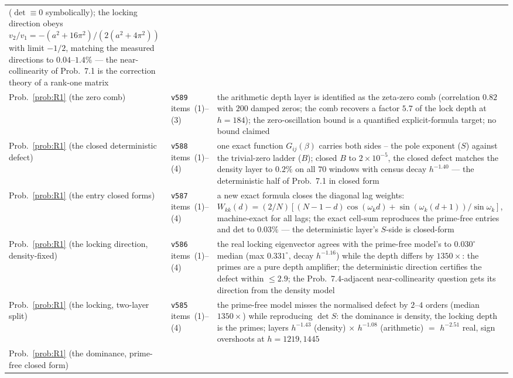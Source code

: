 \documentclass[11pt,a4paper]{article}
\theoremstyle{plain}
\theoremstyle{definition}
\begin{document}
{\begin{xltabular}{\textwidth}{@{}llY@{}}
    ($\det\equiv0$ symbolically); the locking direction obeys
    $v_2/v_1=-(a^2+16\pi^2)/(2(a^2+4\pi^2))$ with limit $-1/2$,
    matching the measured directions to $0.04$--$1.4\%$ --- the
    near-collinearity of Prob.~7.1 is the correction theory of a
    rank-one matrix \\
Prob.~\ref{prob:R1} (the zero comb)
  & \texttt{v589} items~(1)--(3)
  & the arithmetic depth layer is identified as the zeta-zero comb
    (correlation $0.82$ with $200$ damped zeros; the comb recovers a
    factor $5.7$ of the lock depth at $h=184$); the zero-oscillation
    bound is a quantified explicit-formula target; no bound claimed \\
Prob.~\ref{prob:R1} (the closed deterministic defect)
  & \texttt{v588} items~(1)--(4)
  & one exact function $G_{ij}(\beta)$ carries both sides -- the pole
    exponent ($S$) against the trivial-zero ladder ($B$); closed $B$
    to $2\times10^{-5}$, the closed defect matches the density layer
    to $0.2\%$ on all $70$ windows with census decay $h^{-1.40}$ ---
    the deterministic half of Prob.~7.1 in closed form \\
Prob.~\ref{prob:R1} (the entry closed forms)
  & \texttt{v587} items~(1)--(4)
  & a new exact formula closes the diagonal lag weights:
    $W_{kk}(d)=(2/N)[(N{-}1{-}d)\cos(\omega_k d)+\sin(\omega_k(d{+}1))
    /\sin\omega_k]$, machine-exact for all lags; the exact cell-sum
    reproduces the prime-free entries and det to $0.03\%$ --- the
    deterministic layer's $S$-side is closed-form \\
Prob.~\ref{prob:R1} (the locking direction, density-fixed)
  & \texttt{v586} items~(1)--(4)
  & the real locking eigenvector agrees with the prime-free model's to
    $0.030^\circ$ median (max $0.331^\circ$, decay $h^{-1.16}$) while
    the depth differs by $1350\times$: the primes are a pure depth
    amplifier; the deterministic direction certifies the defect within
    $\le2.9$; the Prob.~7.4-adjacent near-collinearity question gets
    its direction from the density model \\
Prob.~\ref{prob:R1} (the locking, two-layer split)
  & \texttt{v585} items~(1)--(4)
  & the prime-free model misses the normalised defect by $2$--$4$
    orders (median $1350\times$) while reproducing $\det S$: the
    dominance is density, the locking depth is the primes; layers
    $h^{-1.43}$ (density) $\times$ $h^{-1.08}$ (arithmetic) $=$
    $h^{-2.51}$ real, sign overshoots at $h=1219,1445$ \\
Prob.~\ref{prob:R1} (the dominance, prime-free closed form)

\end{xltabular}}
\end{document}
